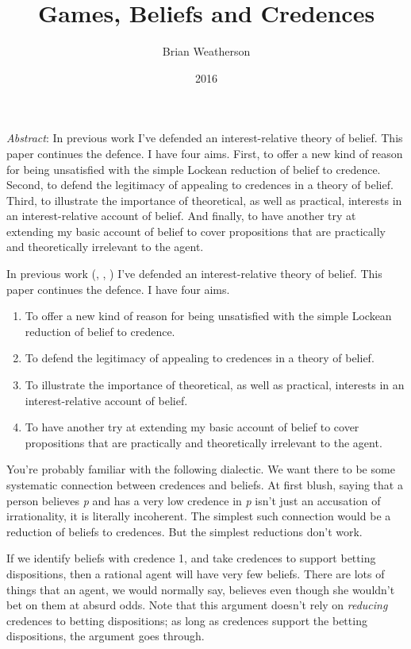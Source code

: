 \documentclass[
  11pt,
  letterpaper,
  DIV=11,
  numbers=noendperiod,
  twoside]{scrartcl}
\title{Games, Beliefs and Credences}
\author{Brian Weatherson}
\date{2016}
\providecommand{\tightlist}{%
  \setlength{\itemsep}{0pt}\setlength{\parskip}{0pt}}\usepackage{longtable,booktabs,array}
\renewenvironment{abstract}
 {\vspace{-1.25cm}
 \quotation\small\noindent\emph{Abstract}:}
 {\endquotation}
\begin{document}
\maketitle
\begin{abstract}
In previous work I've defended an interest-relative theory of belief.
This paper continues the defence. I have four aims. First, to offer a
new kind of reason for being unsatisfied with the simple Lockean
reduction of belief to credence. Second, to defend the legitimacy of
appealing to credences in a theory of belief. Third, to illustrate the
importance of theoretical, as well as practical, interests in an
interest-relative account of belief. And finally, to have another try at
extending my basic account of belief to cover propositions that are
practically and theoretically irrelevant to the agent.
\end{abstract}


In previous work (,
,
) I've defended an
interest-relative theory of belief. This paper continues the defence. I
have four aims.

\begin{enumerate}
\def\labelenumi{\arabic{enumi}.}
\tightlist
\item
  To offer a new kind of reason for being unsatisfied with the simple
  Lockean reduction of belief to credence.
\item
  To defend the legitimacy of appealing to credences in a theory of
  belief.
\item
  To illustrate the importance of theoretical, as well as practical,
  interests in an interest-relative account of belief.
\item
  To have another try at extending my basic account of belief to cover
  propositions that are practically and theoretically irrelevant to the
  agent.
\end{enumerate}

You're probably familiar with the following dialectic. We want there to
be some systematic connection between credences and beliefs. At first
blush, saying that a person believes \emph{p} and has a very low
credence in \emph{p} isn't just an accusation of irrationality, it is
literally incoherent. The simplest such connection would be a reduction
of beliefs to credences. But the simplest reductions don't work.

If we identify beliefs with credence 1, and take credences to support
betting dispositions, then a rational agent will have very few beliefs.
There are lots of things that an agent, we would normally say, believes
even though she wouldn't bet on them at absurd odds. Note that this
argument doesn't rely on \emph{reducing} credences to betting
dispositions; as long as credences support the betting dispositions, the
argument goes through.
\end{document}
